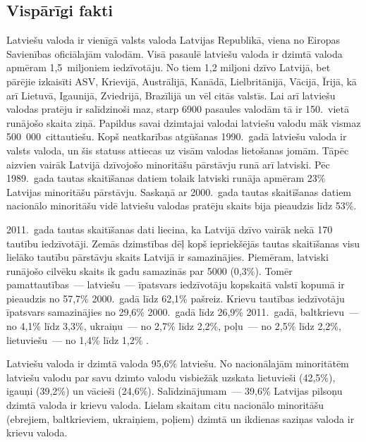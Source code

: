 \begin{multicols}{2}

\subsection{Vispārīgi fakti}

Latviešu valoda ir vienīgā valsts valoda Latvijas Republikā, viena no Eiropas Savienības oficiālajām valodām.
Visā pasaulē latviešu valoda ir dzimtā valoda apmēram 1,5~miljoniem iedzīvotāju. 
No tiem 1,2 miljoni dzīvo Latvijā, bet pārējie izkaisīti ASV, Krievijā, Austrālijā, Kanādā, Lielbritānijā, Vācijā, Īrijā, kā arī Lietuvā, Igaunijā, Zviedrijā, Brazīlijā un vēl citās valstīs. 
Lai arī latviešu valodas pratēju ir salīdzinoši maz, starp 6900 pasaules valodām tā ir 150.~vietā runājošo skaita ziņā. 
Papildus savai dzimtajai valodai latviešu valodu māk vismaz 500~000~cittautiešu. 
Kopš neatkarības atgūšanas 1990.~gadā latviešu valoda ir valsts valoda, un šis statuss attiecas uz visām valodas lietošanas jomām.
Tāpēc aizvien vairāk Latvijā dzīvojošo minoritāšu pārstāvju runā arī latviski. 
Pēc 1989.~gada tautas skaitīšanas datiem tolaik latviski runāja apmēram 23\% Latvijas minoritāšu pārstāvju. 
Saskaņā ar 2000.~gada tautas skaitīšanas datiem nacionālo minoritāšu vidē latviešu valodas pratēju skaits bija pieaudzis līdz 53\%. 


2011.~gada tautas skaitīšanas dati liecina, ka Latvijā dzīvo vairāk nekā 170 tautību iedzīvotāji. 
Zemās dzimstības dēļ kopš iepriekšējās tautas skaitīšanas visu lielāko tautību pārstāvju skaits Latvijā ir samazinājies. 
Piemēram, latviski runājošo cilvēku skaits ik gadu samazinās par 5000 (0,3\%). 
Tomēr pamattautības~--- latviešu~--- īpatsvars iedzīvotāju kopskaitā valstī kopumā ir pieaudzis no 57,7\% 2000.~gadā līdz 62,1\% pašreiz. 
Krievu tautības iedzīvotāju īpatsvars samazinājies no 29,6\% 2000.~gadā līdz 26,9\% 2011.~gadā, baltkrievu~--- no 4,1\% līdz 3,3\%, ukraiņu~--- no 2,7\% līdz 2,2\%, poļu~--- no 2,5\% līdz 2,2\%, lietuviešu~--- no 1,4\% līdz 1,2\% \cite{Meta54}.

Latviešu valoda ir dzimtā valoda 95,6\% latviešu. 
No nacionālajām minoritātēm latviešu valodu par savu dzimto valodu visbiežāk uzskata lietuvieši (42,5\%), igauņi (39,2\%) un vācieši (24,6\%).
Salīdzinājumam~--- 39,6\% Latvijas pilsoņu dzimtā valoda ir krievu valoda.
Lielam skaitam citu nacionālo minoritāšu (ebrejiem, baltkrieviem, ukraiņiem, poļiem) dzimtā un ikdienas saziņas valoda ir krievu valoda.


\end{multicols}
